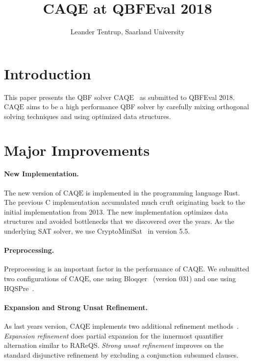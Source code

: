 \documentclass[11pt,twocolumn]{article}
\title{CAQE at QBFEval 2018}
\author{Leander Tentrup, Saarland University}
\date{}
\newcommand{\caqe}{\text{CAQE}}
\begin{document}
\maketitle
  
\section{Introduction}

This paper presents the QBF solver $\caqe$~\cite{conf/fmcad/RabeT15} as submitted to QBFEval 2018.
$\caqe$ aims to be a high performance QBF solver by carefully mixing orthogonal solving techniques and using optimized data structures.

\section{Major Improvements}

\paragraph{New Implementation.}

The new version of $\caqe$ is implemented in the programming language Rust.
The previous C implementation accumulated much cruft originating back to the initial implementation from 2013.
The new implementation optimizes data structures and avoided bottlenecks that we discovered over the years.
As the underlying SAT solver, we use CryptoMiniSat~\cite{conf/sat/SoosNC09} in version 5.5.

\paragraph{Preprocessing.}

Preprocessing is an important factor in the performance of $\caqe$.
We submitted two configurations of $\caqe$, one using Bloqqer~\cite{conf/cade/BiereLS11} (version 031) and one using HQSPre~\cite{conf/tacas/WimmerRM017}.

\paragraph{Expansion and Strong Unsat Refinement.}

As last years version, $\caqe$ implements two additional refinement methods~\cite{conf/cav/Tentrup17}.
\emph{Expansion refinement} does partial expansion for the innermost quantifier alternation similar to RAReQS.
\emph{Strong unsat refinement} improves on the standard disjunctive refinement by excluding a conjunction subsumed clauses.
\end{document}

